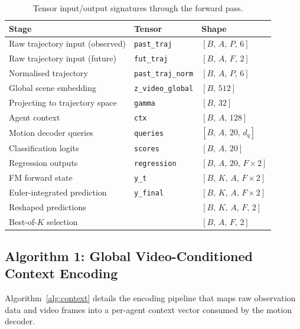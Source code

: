 \documentclass[11pt,a4paper]{article}
\begin{document}
\begin{table}[ht]
\centering
\caption{Tensor input/output signatures through the forward pass.}
\label{tab:tensors}
\small
\begin{tabular}{@{}lll@{}}
\toprule
\textbf{Stage} & \textbf{Tensor} & \textbf{Shape} \\
\midrule
Raw trajectory input (observed) & \texttt{past\_traj} & $[B,\, A,\, P,\, 6]$ \\
Raw trajectory input (future)  & \texttt{fut\_traj}  & $[B,\, A,\, F,\, 2]$ \\
Normalised trajectory          & \texttt{past\_traj\_norm} & $[B,\, A,\, P,\, 6]$ \\
Global scene embedding         & \texttt{z\_video\_global} & $[B,\, 512]$ \\
Projecting to trajectory space & \texttt{gamma} & $[B,\, 32]$ \\
Agent context                  & \texttt{ctx} & $[B,\, A,\, 128]$ \\
Motion decoder queries          & \texttt{queries} & $[B,\, A,\, 20,\, d_q]$ \\
Classification logits          & \texttt{scores} & $[B,\, A,\, 20]$ \\
Regression outputs             & \texttt{regression} & $[B,\, A,\, 20,\, F \times 2]$ \\
FM forward state               & \texttt{y\_t} & $[B,\, K,\, A,\, F \times 2]$ \\
Euler-integrated prediction    & \texttt{y\_final} & $[B,\, K,\, A,\, F \times 2]$ \\
Reshaped predictions           & & $[B,\, K,\, A,\, F,\, 2]$ \\
Best-of-$K$ selection          & & $[B,\, A,\, F,\, 2]$ \\
\bottomrule
\end{tabular}
\end{table}

\subsection{Algorithm 1: Global Video-Conditioned Context Encoding}

Algorithm~\ref{alg:context} details the encoding pipeline that maps raw observation data and video frames into a per-agent context vector consumed by the motion decoder.
\end{document}
